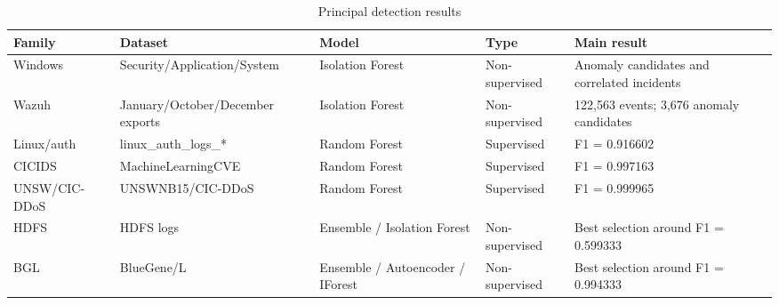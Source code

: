 \begin{table}[t]
\caption{Principal detection results}
\label{tab:main_results_full}
\centering
\scriptsize
\begin{tabularx}{\linewidth}{p{1.5cm}p{2.1cm}p{2.0cm}p{1.6cm}X}
\toprule
\textbf{Family} & \textbf{Dataset} & \textbf{Model} & \textbf{Type} & \textbf{Main result} \\
\midrule
Windows & Security/Application/System & Isolation Forest & Non-supervised & Anomaly candidates and correlated incidents \\
Wazuh & January/October/December exports & Isolation Forest & Non-supervised & 122,563 events; 3,676 anomaly candidates \\
Linux/auth & linux\_auth\_logs\_* & Random Forest & Supervised & F1 = 0.916602 \\
CICIDS & MachineLearningCVE & Random Forest & Supervised & F1 = 0.997163 \\
UNSW/CIC-DDoS & UNSWNB15/CIC-DDoS & Random Forest & Supervised & F1 = 0.999965 \\
HDFS & HDFS logs & Ensemble / Isolation Forest & Non-supervised & Best selection around F1 = 0.599333 \\
BGL & BlueGene/L & Ensemble / Autoencoder / IForest & Non-supervised & Best selection around F1 = 0.994333 \\
\bottomrule
\end{tabularx}
\end{table}
